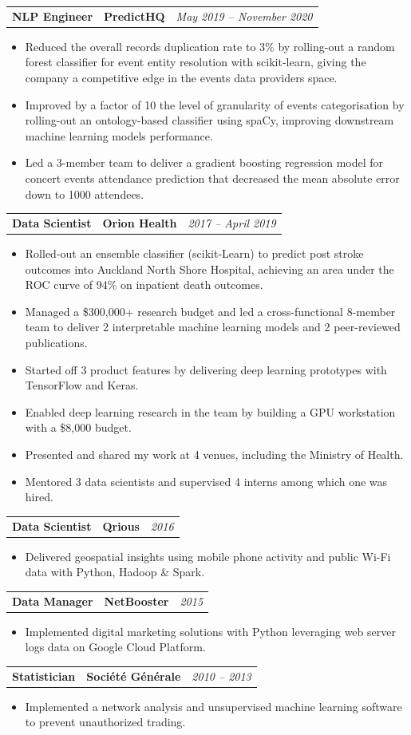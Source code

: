 \documentclass[letterpaper,11pt]{article}
\newcommand{\resumeItemListStart}{\begin{itemize}[label=$\circ$, topsep=0.1cm, parsep=0cm, partopsep=0cm, itemsep=0.1cm, leftmargin=0.4cm]}
\newcommand{\resumeItem}[1]{\item\small{#1}}
\newcommand{\resumeItemListEnd}{\end{itemize}}
\newcommand{\job}[4]{
    \begin{tabular}{p{7cm}p{6cm}p{5cm}}
      \hspace{-0.7em} \textbf{#1} & \textbf{\small{#2}} & \hfill \textit{\small{#4}}
    \end{tabular}
}
\begin{document}
\job {NLP Engineer}{PredictHQ}{Auckland}{May 2019 -- November 2020}
\resumeItemListStart
\resumeItem {Reduced the overall records duplication rate to 3\% by rolling-out a random forest classifier for event entity resolution with scikit-learn, giving the company a competitive edge in the events data providers space.}
\resumeItem {Improved by a factor of 10 the level of granularity of events categorisation by rolling-out an ontology-based classifier using spaCy, improving downstream machine learning models performance.}
\resumeItem {Led a 3-member team to deliver a gradient boosting regression model for concert events attendance prediction that decreased the mean absolute error down to 1000 attendees.}
\resumeItemListEnd \vspace{0.2cm}
	
\job {Data Scientist}{Orion Health}{Auckland}{2017 -- April 2019}
\resumeItemListStart
\resumeItem {Rolled-out an ensemble classifier (scikit-Learn) to predict post stroke outcomes into Auckland North Shore Hospital, achieving an area under the ROC curve of 94\% on inpatient death outcomes.}
\resumeItem {Managed a \$300,000+ research budget and led a cross-functional 8-member team to deliver 2 interpretable machine learning models and 2 peer-reviewed publications.}
\resumeItem {Started off 3 product features by delivering deep learning prototypes with TensorFlow and Keras.}
\resumeItem {Enabled deep learning research in the team by building a GPU workstation with a \$8,000 budget.}
\resumeItem {Presented and shared my work at 4 venues, including the Ministry of Health.}
\resumeItem {Mentored 3 data scientists and supervised 4 interns among which one was hired.}
\resumeItemListEnd \vspace{0.2cm}

\job {Data Scientist}{Qrious}{Auckland}{2016}
\resumeItemListStart
\resumeItem {Delivered geospatial insights using mobile phone activity and public Wi-Fi data with Python, Hadoop \& Spark.}
\resumeItemListEnd \vspace{0.2cm}

\job {Data Manager}{NetBooster}{Paris}{2015}
\resumeItemListStart
\resumeItem {Implemented digital marketing solutions with Python leveraging web server logs data on Google Cloud Platform.}
\resumeItemListEnd \vspace{0.2cm}

\job {Statistician}{Société Générale}{Paris}{2010 -- 2013}
\resumeItemListStart
\resumeItem {Implemented a network analysis and unsupervised machine learning software to prevent unauthorized trading.}
\resumeItemListEnd 
\end{document}
